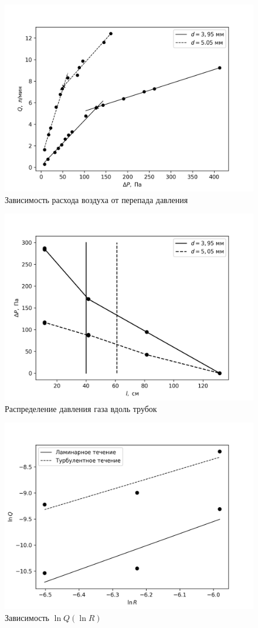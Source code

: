 \documentclass[14pt, a4paper]{report}
\begin{document}
\begin{figure}[!ht]
\centering
\includegraphics[width=0.8\linewidth]{terma3_1.png}
\caption{Зависимость расхода воздуха от перепада давления}
\end{figure}

\begin{figure}[!ht]
\centering
\includegraphics[width=0.8\linewidth]{terma3_2.png}
\caption{Распределение давления газа вдоль трубок}
\end{figure}

\begin{figure}[!ht]
\centering
\includegraphics[width=0.8\linewidth]{terma3_3.png}
\caption{Зависимость $\ln Q(\ln R)$}
\end{figure}
\end{document}
